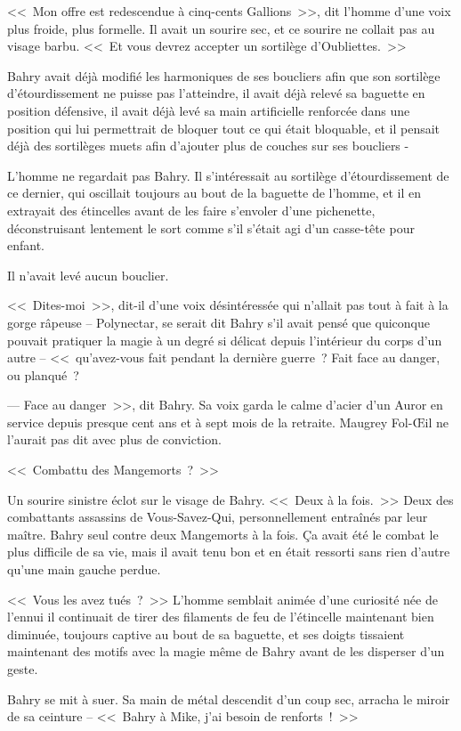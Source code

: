 <<~Mon offre est redescendue à cinq-cents Gallions~>>, dit l'homme d'une voix plus froide, plus formelle. Il avait un sourire sec, et ce sourire ne collait pas au visage barbu. <<~Et vous devrez accepter un sortilège d'Oubliettes.~>>

Bahry avait déjà modifié les harmoniques de ses boucliers afin que son sortilège d'étourdissement ne puisse pas l'atteindre, il avait déjà relevé sa baguette en position défensive, il avait déjà levé sa main artificielle renforcée dans une position qui lui permettrait de bloquer tout ce qui était bloquable, et il pensait déjà des sortilèges muets afin d'ajouter plus de couches sur ses boucliers -

L'homme ne regardait pas Bahry. Il s'intéressait au sortilège d'étourdissement de ce dernier, qui oscillait toujours au bout de la baguette de l'homme, et il en extrayait des étincelles avant de les faire s'envoler d'une pichenette, déconstruisant lentement le sort comme s'il s'était agi d'un casse-tête pour enfant.

Il n'avait levé aucun bouclier.

<<~Dites-moi~>>, dit-il d'une voix désintéressée qui n'allait pas tout à fait à la gorge râpeuse -- Polynectar, se serait dit Bahry s'il avait pensé que quiconque pouvait pratiquer la magie à un degré si délicat depuis l'intérieur du corps d'un autre -- <<~qu'avez-vous fait pendant la dernière guerre~? Fait face au danger, ou planqué~?

--- Face au danger~>>, dit Bahry. Sa voix garda le calme d'acier d'un Auror en service depuis presque cent ans et à sept mois de la retraite. Maugrey Fol-Œil ne l'aurait pas dit avec plus de conviction.

<<~Combattu des Mangemorts~?~>>

Un sourire sinistre éclot sur le visage de Bahry. <<~Deux à la fois.~>> Deux des combattants assassins de Vous-Savez-Qui, personnellement entraînés par leur maître. Bahry seul contre deux Mangemorts à la fois. Ça avait été le combat le plus difficile de sa vie, mais il avait tenu bon et en était ressorti sans rien d'autre qu'une main gauche perdue.

<<~Vous les avez tués~?~>> L'homme semblait animée d'une curiosité née de l'ennui il continuait de tirer des filaments de feu de l'étincelle maintenant bien diminuée, toujours captive au bout de sa baguette, et ses doigts tissaient maintenant des motifs avec la magie même de Bahry avant de les disperser d'un geste.

Bahry se mit à suer. Sa main de métal descendit d'un coup sec, arracha le miroir de sa ceinture -- <<~Bahry à Mike, j'ai besoin de renforts~!~>>

